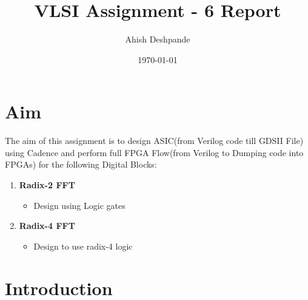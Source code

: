 \documentclass[a4paper,10pt]{report}
\begin{document}
\title{VLSI Assignment - 6 Report}
\author{Ahish Deshpande}
\date{\today}
\maketitle


\tableofcontents

\newpage

\renewcommand\thesection{\arabic{section}}
\section{Aim}

The aim of this assignment is to design ASIC(from Verilog code till GDSII File) using Cadence and perform full FPGA Flow(from Verilog to Dumping code into FPGAs) for the following Digital Blocks:
\begin{enumerate}

	\item \textbf{Radix-2 FFT}
		\begin{itemize}
			\item Design using Logic gates
		\end{itemize}

	\item \textbf{Radix-4 FFT}
		\begin{itemize}
			\item Design to use radix-4 logic
		\end{itemize}

\end{enumerate}

\section{Introduction}
\end{document}
